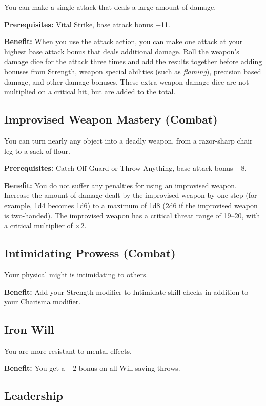 				
You can make a single attack that deals a large amount of damage.
				
\textbf{Prerequisites:} Vital Strike, base attack bonus +11.
				
\textbf{Benefit:} When you use the attack action, you can make one attack at your highest base attack bonus that deals additional damage. Roll the weapon's damage dice for the attack three times and add the results together before adding bonuses from Strength, weapon special abilities (such as \textit{flaming}), precision based damage, and other damage bonuses. These extra weapon damage dice are not multiplied on a critical hit, but are added to the total.
				
\subsection{Improvised Weapon Mastery (Combat)}

				
You can turn nearly any object into a deadly weapon, from a razor-sharp chair leg to a sack of flour.
				
\textbf{Prerequisites:} Catch Off-Guard or Throw Anything, base attack bonus +8.
				
\textbf{Benefit:} You do not suffer any penalties for using an improvised weapon. Increase the amount of damage dealt by the improvised weapon by one step (for example, 1d4 becomes 1d6) to a maximum of 1d8 (2d6 if the improvised weapon is two-handed). The improvised weapon has a critical threat range of 19--20, with a critical multiplier of \mbox{$\times$}2.
				
\subsection{Intimidating Prowess (Combat)}

				
Your physical might is intimidating to others.
				
\textbf{Benefit:} Add your Strength modifier to Intimidate skill checks in addition to your Charisma modifier.
				
\subsection{Iron Will}

				
You are more resistant to mental effects.
				
\textbf{Benefit:} You get a +2 bonus on all Will saving throws.
				
\subsection{Leadership}

